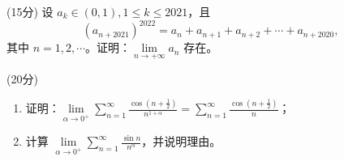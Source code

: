 \documentclass[loose]{ExBook}
\begin{document}
\begin{qitems}
    \begin{bbox}
        \qitem (15分) 设 \( a_k \in (0, 1), 1 \leq k \leq 2021 \)，且
        \[
        (a_{n+2021})^{2022} = a_n + a_{n+1} + a_{n+2} + \cdots + a_{n+2020},
        \]
        其中 \( n = 1, 2, \cdots \)。证明：\( \lim\limits_{n \to +\infty} a_n \) 存在。
    \end{bbox}

    \begin{bbox}
        \qitem (20分) 
        \begin{enumerate}[label=(\arabic*)]
            \item 证明：\( \lim\limits_{\alpha \to 0^+} \sum_{n=1}^{\infty} \frac{\cos \left(n + \frac{1}{2}\right)}{n^{1+\alpha}} = \sum_{n=1}^{\infty} \frac{\cos \left(n + \frac{1}{2}\right)}{n} \)；
            \item 计算 \( \lim\limits_{\alpha \to 0^+} \sum_{n=1}^{\infty} \frac{\sin n}{n^{\alpha}} \)，并说明理由。
        \end{enumerate}
    \end{bbox}
\end{qitems}
\end{document}
